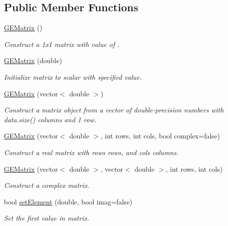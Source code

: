 \subsection*{Public Member Functions}
\begin{DoxyCompactItemize}
\item 
\hyperlink{class_g_e_matrix_a8efdf9ec85fdcfa0e9f1317722e81c52}{G\-E\-Matrix} ()
\begin{DoxyCompactList}\small\item\em Construct a {\ttfamily 1x1} matrix with value of {}. \end{DoxyCompactList}\item 
\hyperlink{class_g_e_matrix_af9ebcc214a2086c4692fa107c3ee53e9}{G\-E\-Matrix} (double)
\begin{DoxyCompactList}\small\item\em Initialize matrix to scalar with specified value. \end{DoxyCompactList}\item 
\hyperlink{class_g_e_matrix_ac48ac546516c7fb55a601f3875a5b23d}{G\-E\-Matrix} (vector$<$ double $>$)
\begin{DoxyCompactList}\small\item\em Construct a matrix object from a vector of double-\/precision numbers with {\ttfamily data.\-size()} columns and 1 row. \end{DoxyCompactList}\item 
\hyperlink{class_g_e_matrix_a926e3559025f6670e228b1c845457faa}{G\-E\-Matrix} (vector$<$ double $>$, int rows, int cols, bool complex=false)
\begin{DoxyCompactList}\small\item\em Construct a real matrix with {\itshape rows} rows, and {\itshape cols} columns. \end{DoxyCompactList}\item 
\hyperlink{class_g_e_matrix_aca44eb90745693a11023911071aee70a}{G\-E\-Matrix} (vector$<$ double $>$, vector$<$ double $>$, int rows, int cols)
\begin{DoxyCompactList}\small\item\em Construct a complex matrix. \end{DoxyCompactList}\item 
bool \hyperlink{class_g_e_matrix_a598ff86c462efb947271a067929f9c92}{set\-Element} (double, bool imag=false)
\begin{DoxyCompactList}\small\item\em Set the first value in matrix. \end{DoxyCompactList}\item 

\end{DoxyCompactItemize}
